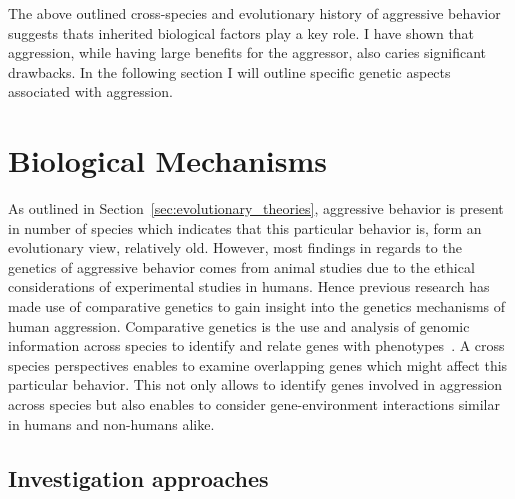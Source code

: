 The above outlined cross-species and evolutionary history of aggressive behavior suggests thats inherited biological factors play a key role.
I have shown that aggression, while having large benefits for the aggressor, also caries significant drawbacks.
In the following section I will outline specific genetic aspects associated with aggression.


\section{Biological Mechanisms}
\label{sec:biological_mechanisms}

As outlined in Section~\ref{sec:evolutionary_theories}, aggressive behavior is present in number of species which indicates that this particular behavior is, form an evolutionary view, relatively old.
However, most findings in regards to the genetics of aggressive behavior comes from animal studies due to the ethical considerations of experimental studies in humans.
Hence previous research has made use of comparative genetics to gain insight into the genetics mechanisms of human aggression.
Comparative genetics is the use and analysis of genomic information across species to identify and relate genes with phenotypes~\cite{Maxson2003}.
A cross species perspectives enables to examine overlapping genes which might affect this particular behavior.
This not only allows to identify genes involved in aggression across species but also enables to consider gene-environment interactions similar in humans and non-humans alike.

\subsection{Investigation approaches}
\label{sub:investigation_approaches}

